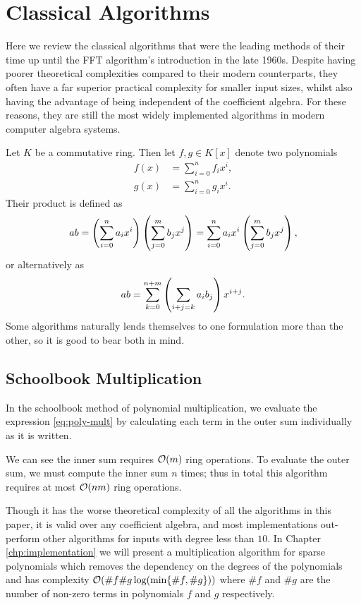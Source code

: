 \chapter{Classical Algorithms}\label{chp:classical}

Here we review the classical algorithms that were the leading methods of their time up until the FFT algorithm's introduction in the late 1960s. Despite having poorer theoretical complexities compared to their modern counterparts, they often have a far superior practical complexity for smaller input sizes, whilst also having the advantage of being independent of the coefficient algebra. For these reasons, they are still the most widely implemented algorithms in modern computer algebra systems.

Let $K$ be a commutative ring. Then let $f, g \in K[x]$ denote two polynomials
\begin{align*}
    f(x) &= \sum^n_{i=0} f_ix^i,\\
    g(x) &= \sum^n_{i=0} g_ix^i.
\end{align*}
Their product is defined as
\begin{equation}\label{eq:poly-mult}
    ab = \left(\sum^n_{i=0} a_i x^i\right)\left(\sum^m_{j=0} b_j x^j\right) = \sum^n_{i=0} a_ix^i\left(\sum^m_{j=0} b_j x^j\right),
\end{equation}
or alternatively as
\begin{equation}\label{eq:poly-mult-conv}
    ab = \sum^{n + m}_{k=0} \left(\sum_{i + j = k}a_ib_j\right) x^{i + j}.
\end{equation}
Some algorithms naturally lends themselves to one formulation more than the other, so it is good to bear both in mind.

\section{Schoolbook Multiplication}
\label{sec:prelim-schoolbook}

In the schoolbook method of polynomial multiplication, we evaluate the expression \eqref{eq:poly-mult} by calculating each term in the outer sum individually as it is written.

We can see the inner sum requires $\mathcal O(m)$ ring operations. To evaluate the outer sum, we must compute the inner sum $n$ times; thus in total this algorithm requires at most $\mathcal O(nm)$ ring operations.

Though it has the worse theoretical complexity of all the algorithms in this paper, it is valid over any coefficient algebra, and most implementations out-perform other algorithms for inputs with degree less than $10$. In Chapter \ref{chp:implementation} we will present a multiplication algorithm for sparse polynomials which removes the dependency on the degrees of the polynomials and has complexity $\mathcal O(\# f \# g \log(\min\{\# f, \# g\}))$ where $\# f$ and $\# g$ are the number of non-zero terms in polynomials $f$ and $g$ respectively.

